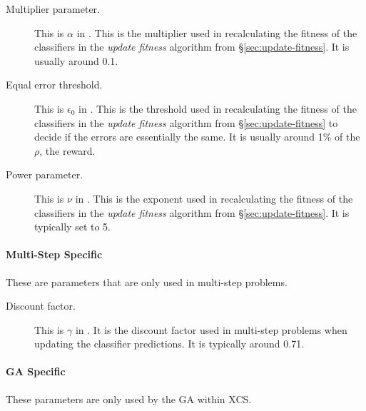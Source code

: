 \begin{description}
\item [Multiplier parameter.]
This is $\alpha$ in \cite{ButzWilson}.
This is the multiplier used in recalculating the fitness of the classifiers in the
\emph{update fitness} algorithm from \S\ref{sec:update-fitness}.
It is usually around 0.1.
\item [Equal error threshold.]
This is $\epsilon_0$ in \cite{ButzWilson}.
This is the threshold used in recalculating the fitness of the classifiers in the
\emph{update fitness} algorithm from \S\ref{sec:update-fitness} to decide if the errors are essentially the same.
It is usually around 1\% of the $\rho$, the reward.
\item [Power parameter.]
This is $\nu$ in \cite{ButzWilson}.
This is the exponent used in recalculating the fitness of the classifiers in the
\emph{update fitness} algorithm from \S\ref{sec:update-fitness}.
It is typically set to 5.
\end{description}

\paragraph{Multi-Step Specific}
These are parameters that are only used in multi-step problems.

\begin{description}
\item [Discount factor.]
This is $\gamma$ in \cite{ButzWilson}.
It is the discount factor used in multi-step problems when updating the classifier predictions.
It is typically around 0.71.
\end{description}

\paragraph{GA Specific}
These parameters are only used by the GA within XCS.

